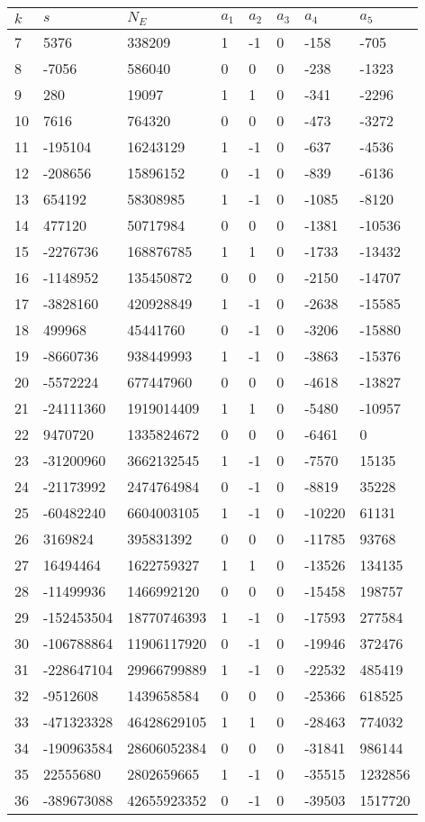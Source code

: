 \documentclass{amsart}
\begin{document}
\begin{longtable}{|l|l|l|lllll|}
\hline
$k$ & $s$ & $N_E$ & $a_1$ & $a_2$ & $a_3$ & $a_4$ & $a_5$\\
\hline
7&5376&338209&1&-1&0&-158&-705\\
8&-7056&586040&0&0&0&-238&-1323\\
9&280&19097&1&1&0&-341&-2296\\
10&7616&764320&0&0&0&-473&-3272\\
11&-195104&16243129&1&-1&0&-637&-4536\\
12&-208656&15896152&0&-1&0&-839&-6136\\
13&654192&58308985&1&-1&0&-1085&-8120\\
14&477120&50717984&0&0&0&-1381&-10536\\
15&-2276736&168876785&1&1&0&-1733&-13432\\
16&-1148952&135450872&0&0&0&-2150&-14707\\
17&-3828160&420928849&1&-1&0&-2638&-15585\\
18&499968&45441760&0&-1&0&-3206&-15880\\
19&-8660736&938449993&1&-1&0&-3863&-15376\\
20&-5572224&677447960&0&0&0&-4618&-13827\\
21&-24111360&1919014409&1&1&0&-5480&-10957\\
22&9470720&1335824672&0&0&0&-6461&0\\
23&-31200960&3662132545&1&-1&0&-7570&15135\\
24&-21173992&2474764984&0&-1&0&-8819&35228\\
25&-60482240&6604003105&1&-1&0&-10220&61131\\
26&3169824&395831392&0&0&0&-11785&93768\\
27&16494464&1622759327&1&1&0&-13526&134135\\
28&-11499936&1466992120&0&0&0&-15458&198757\\
29&-152453504&18770746393&1&-1&0&-17593&277584\\
30&-106788864&11906117920&0&-1&0&-19946&372476\\
31&-228647104&29966799889&1&-1&0&-22532&485419\\
32&-9512608&1439658584&0&0&0&-25366&618525\\
33&-471323328&46428629105&1&1&0&-28463&774032\\
34&-190963584&28606052384&0&0&0&-31841&986144\\
35&22555680&2802659665&1&-1&0&-35515&1232856\\
36&-389673088&42655923352&0&-1&0&-39503&1517720\\

\end{longtable}
\end{document}
